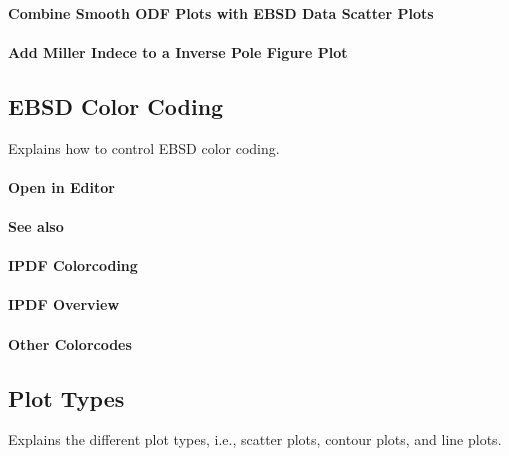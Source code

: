 \documentclass{article}
\begin{document}
			\paragraph{Combine Smooth ODF Plots with EBSD Data Scatter Plots}
		
			\paragraph{Add Miller Indece to a Inverse Pole Figure Plot}
		
		\subsection{EBSD Color Coding}

		
                     \begin{par}
Explains how to control EBSD color coding.
\end{par} \vspace{1em}

                  
			\paragraph{Open in Editor}
		
			\paragraph{See also}
		
			\paragraph{IPDF Colorcoding}
		
			\paragraph{IPDF Overview}
		
			\paragraph{Other Colorcodes}
		
		\subsection{Plot Types}

		
                     \begin{par}
Explains the different plot types, i.e., scatter plots, contour plots, and line plots.
\end{par} \vspace{1em}
\end{document}
